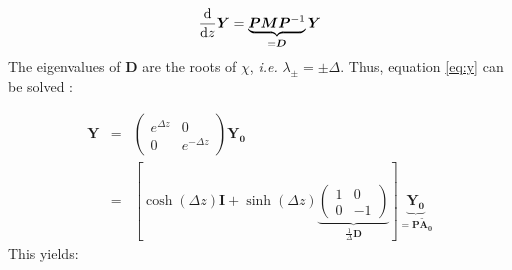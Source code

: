 \begin{equation}
	\dv{z}\bm{Y} = \underbrace{\bm{P}\bm{M}\bm{P}^{-1}}_{=\bm{D}}\bm{Y}\label{eq:y}
\end{equation}
The eigenvalues of $\bm{D}$ are the roots of $\chi$, \textit{i.e.} $\lambda_\pm = \pm \Delta$. Thus, equation \ref{eq:y} can be solved :

\begin{eqnarray}
	\bm{Y} &=& \begin{pmatrix}
	e^{\Delta z} & 0\\
	0 & e^{-\Delta z}
	\end{pmatrix} \bm{Y_0}\\
	&=& \left[\cosh(\Delta z)\bm{I} + \sinh(\Delta z)\underbrace{\begin{pmatrix}
	1 & 0\\
	0 & -1
	\end{pmatrix}}_{\frac{1}{\Delta}\bm{D}}\right]\underbrace{\bm{Y_0}}_{=\bm{P}\bm{\tilde{A}_0}}
\end{eqnarray}
This yields:

